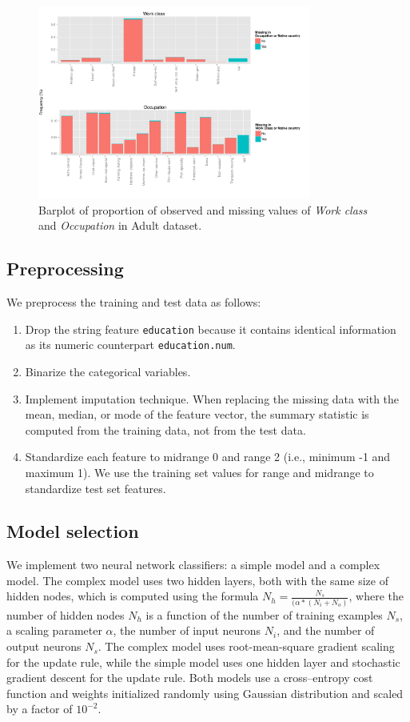 \documentclass[10pt,twocolumn,letterpaper]{article}
\begin{document}
\begin{figure}[htbp] 
   \centering
   \includegraphics[width=0.8\textwidth]{./figure/barplot-missing.pdf}
   \caption{Barplot of proportion of observed and missing values of \textit{Work class} and \textit{Occupation} in Adult dataset.}
   \label{fig:barplot-missing}
\end{figure}

\subsection{Preprocessing}

We preprocess the training and test data as follows:

\begin{enumerate}
\item Drop the string feature \texttt{education} because it contains identical information as its numeric counterpart \texttt{education.num}.
\item Binarize the categorical variables.
\item Implement imputation technique. When replacing the missing data with the mean, median, or mode of
    the feature vector, the summary statistic is computed from the training data, not from the test data.
\item Standardize each feature to midrange 0 and range 2 (i.e., minimum -1 and maximum 1). We use the training set values for range and midrange to standardize test set features.
\end{enumerate}

\subsection{Model selection}

We implement two neural network classifiers: a simple model and a complex model. The complex model uses two hidden layers, both with the same size of hidden nodes, which is computed using the formula $N_h = \frac{N_s}{(\alpha * (N_i + N_o)}$, where the number of hidden nodes $N_h$ is a function of the number of training examples $N_s$, a scaling parameter $\alpha$, the number of input neurons $N_i$, and the number of output neurons $N_s$. The complex model uses root-mean-square gradient scaling for the update rule, while the simple model uses one hidden layer and stochastic gradient descent for the update rule. Both models use a cross--entropy cost function and weights initialized randomly using Gaussian distribution and scaled by a factor of $10^{-2}$. 
\end{document}
